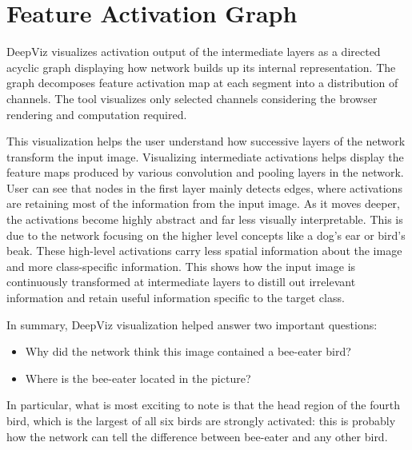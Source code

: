 \clearpage
\section*{Feature Activation Graph}

DeepViz visualizes activation output of the intermediate layers as a directed acyclic graph displaying how network builds up its internal representation. The graph decomposes feature activation map at each segment into a distribution of channels. The tool visualizes only selected channels considering the browser rendering and computation required.

This visualization helps the user understand how successive layers of the network transform the input image. Visualizing intermediate activations helps display the feature maps produced by various convolution and pooling layers in the network. User can see that nodes in the first layer mainly detects edges, where activations are retaining most of the information from the input image. As it moves deeper, the activations become highly abstract and far less visually interpretable. This is due to the network focusing on the higher level concepts like a dog's ear or bird's beak. These high-level activations carry less spatial information about the image and more class-specific information. This shows how the input image is continuously transformed at intermediate layers to distill out irrelevant information and retain useful information specific to the target class.

In summary, DeepViz visualization helped answer two important questions:
\vspace{-1em}
\begin{itemize}
\item  Why did the network think this image contained a bee-eater bird?
\vspace{-1em}
\item Where is the bee-eater located in the picture?
\end{itemize}
\vspace{-1em}
In particular, what is most exciting to note is that the head region of the fourth bird, which is the largest of all six birds are strongly activated: this is probably how the network can tell the difference between bee-eater and any other bird.

\vspace{-1em}
